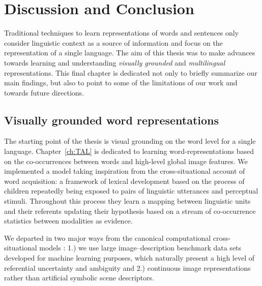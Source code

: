 \chapter{Discussion and Conclusion}
\label{ch:conclusion}

Traditional techniques to learn representations of words and sentences only consider 
linguistic context as a source of information and focus on the representation of a single language.
The aim of this thesis was to make advances towards learning 
and understanding \emph{visually grounded} and \emph{multilingual} representations. 
This final chapter is dedicated not only to briefly summarize our main findings, but also to 
point to some of the limitations of our work and towards future directions.


\section{Visually grounded word representations}
The starting point of the thesis is visual grounding on the word level for a single language.
Chapter~\ref{ch:TAL} is dedicated to learning word-representations based on the co-occurrences between 
words and high-level global image features. We implemented a model taking inspiration from
the cross-situational account of word acquisition: a framework of lexical development
based on the process of children repeatedly being exposed to pairs of linguistic utterances and 
perceptual stimuli.  Throughout this process they learn a mapping between linguistic 
units and their referents updating their hypothesis based on a stream of co-occurrence statistics
between modalities as evidence. 


We departed in two major ways from the canonical computational cross-situational models 
 \citep{siskind.96,fontanari2009cross,fazly.etal.10,kachergis2012associative,matusevych2013automatic,yu2013grounded}: 
1.) we use large image--description benchmark data sets developed for machine learning purposes, 
which naturally present a high level of referential uncertainty and ambiguity and
2.) continuous image representations rather than artificial symbolic scene descriptors.

